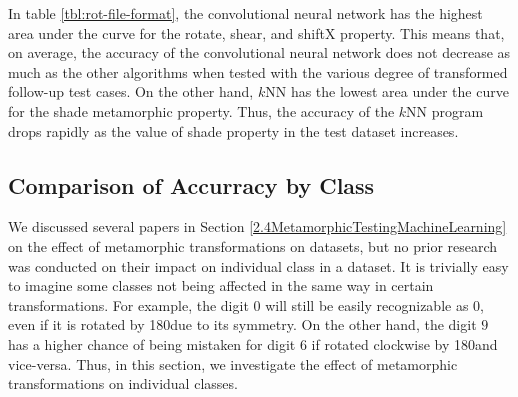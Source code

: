     In table \ref{tbl:rot-file-format}, the convolutional neural network has the highest area under the curve for the rotate, shear, and shiftX property. This means that, on average, the accuracy of the convolutional neural network does not decrease as much as the other algorithms when tested with the various degree of transformed follow-up test cases.
    On the other hand, $k$NN has the lowest area under the curve for the shade metamorphic property. Thus, the accuracy of the $k$NN program drops rapidly as the value of shade property in the test dataset increases.
    

\subsection{Comparison of Accurracy by Class}\label{Digit-by Accuracy}
    We discussed several papers in Section \ref{2.4MetamorphicTestingMachineLearning} on the effect of metamorphic transformations on datasets, but no prior research was conducted on their impact on individual class in a dataset. It is trivially easy to imagine some classes not being affected in the same way in certain transformations. For example, the digit $0$ will still be easily recognizable as $0$, even if it is rotated by 180\textdegree  due to its symmetry. On the other hand, the digit $9$ has a higher chance of being mistaken for digit $6$ if rotated clockwise by 180\textdegree and vice-versa. Thus, in this section, we investigate the effect of metamorphic transformations on individual classes.
    
